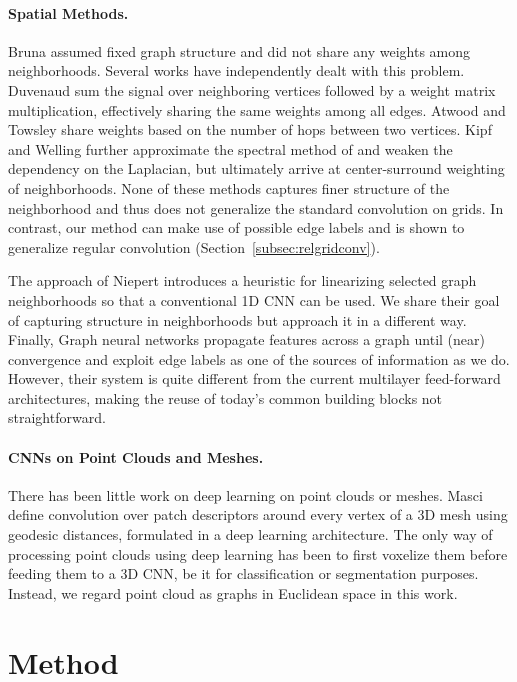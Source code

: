 \documentclass[10pt,twocolumn,letterpaper]{article}
\begin{document}
\paragraph*{Spatial Methods.} Bruna \etal \cite{bruna13} assumed fixed graph structure and did not share any weights among neighborhoods. Several works have independently dealt with this problem. Duvenaud \etal \cite{duvenaud} sum the signal over neighboring vertices followed by a weight matrix multiplication, effectively sharing the same weights among all edges. Atwood and Towsley \cite{dcnn} share weights based on the number of hops between two vertices. Kipf and Welling \cite{kipf} further approximate the spectral method of \cite{defferrard16} and weaken the dependency on the Laplacian, but ultimately arrive at center-surround weighting of neighborhoods. None of these methods captures finer structure of the neighborhood and thus does not generalize the standard convolution on grids. In contrast, our method can make use of possible edge labels and is shown to generalize regular convolution (Section~\ref{subsec:relgridconv}). 

The approach of Niepert \etal \cite{niepert} introduces a heuristic for linearizing selected graph neighborhoods so that a conventional 1D CNN can be used. We share their goal of capturing structure in neighborhoods but approach it in a different way. Finally, Graph neural networks \cite{scarselli09,yujia16} propagate features across a graph until (near) convergence and exploit edge labels as one of the sources of information as we do. However, their system is quite different from the current multilayer feed-forward architectures, making the reuse of today's common building blocks not straightforward.

\paragraph*{CNNs on Point Clouds and Meshes.} There has been little work on deep learning on point clouds or meshes. Masci \etal \cite{masci15} define convolution over patch descriptors around every vertex of a 3D mesh using geodesic distances, formulated in a deep learning architecture. The only way of processing point clouds using deep learning has been to first voxelize them before feeding them to a 3D CNN, be it for classification \cite{voxnet} or segmentation \cite{pclabeling16} purposes. Instead, we regard point cloud as graphs in Euclidean space in this work. 


\section{Method} \label{sec:method}
\end{document}
